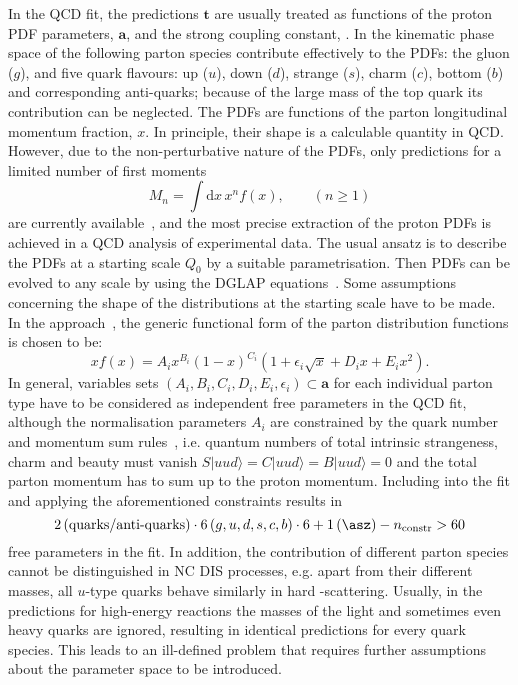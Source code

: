 In the QCD fit, the predictions $\mathbf{t}$ are usually treated as functions of the proton PDF parameters, $\mathbf{a}$, and the strong coupling constant, \asz. In the kinematic phase space of \hera the following parton species contribute effectively to the PDFs: the gluon ($g$), and five quark flavours: up ($u$), down ($d$), strange ($s$), charm ($c$), bottom ($b$) and corresponding anti-quarks; because of the large mass of the top quark its contribution can be neglected. The PDFs are functions of the parton longitudinal momentum fraction, $x$. In principle, their shape is a calculable quantity in QCD. However, due to the non-perturbative nature of the PDFs, only predictions for a limited number of first moments 
\begin{equation}
 M_n=\int\mathrm{d}x\,x^n f\left(x\right), \qquad (n\ge1)
\end{equation}
are currently available~\cite{Hagler:2009ni}, and the most precise extraction of the proton PDFs is achieved in a QCD analysis of experimental data. The usual ansatz is to describe the PDFs at a starting scale $Q_0$ by a suitable parametrisation. Then PDFs can be evolved to any scale by using the DGLAP equations~\cite{Altarelli:1977zs,Gribov:1972,Dokshitzer:1977,Balitsky:1978}. Some assumptions concerning the shape of the distributions at the starting scale have to be made. In the \herapdf approach~\cite{Aaron:2009aa}, the generic functional form of the parton distribution functions is chosen to be:
\begin{equation}
 xf\left(x\right) = A_ix^{B_i}\left(1-x\right)^{C_i}\left(1+\epsilon_i\sqrt{x}+D_ix+E_ix^2\right).
 \label{eq:pdfansatz}
\end{equation}
In general, variables sets $\left(A_i,B_i,C_i,D_i,E_i,\epsilon_i\right)\subset\mathbf{a}$ for each individual parton type have to be considered as independent free parameters in the QCD fit, although the normalisation parameters $A_i$ are constrained by the quark number and momentum sum rules~\cite{Yndurain:2006lfa}, i.e. quantum numbers of total intrinsic strangeness, charm and beauty must vanish $S|uud\rangle=C|uud\rangle=B|uud\rangle=0$ and the total parton momentum has to sum up to the proton momentum. Including \asz into the fit and applying the aforementioned constraints results in 
\begin{equation}
2 \left( \text{quarks/anti-quarks}\right)\cdot 6\left(g,u,d,s,c,b\right)\cdot 6 + 1\left(\asz\right) - n_\text{constr} > 60
\end{equation}
free parameters in the fit. In addition, the contribution of different parton species cannot be distinguished in NC DIS processes, e.g. apart from their different masses, all $u$-type quarks behave similarly in hard \ep-scattering. Usually, in the predictions for high-energy reactions the masses of the light and sometimes even heavy quarks are ignored, resulting in identical predictions for every quark species. This leads to an ill-defined problem that requires further assumptions about the parameter space to be introduced. 

